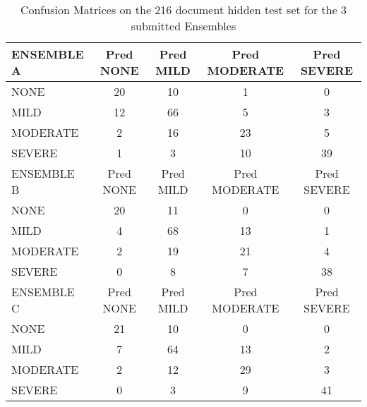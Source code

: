 \begin{table}
\centering
    \begin{tabular}{|l|c|c|c|c|}
       \hline
       \textsf{ \cellcolor{gray!15} ENSEMBLE A } & \textsf{ Pred NONE } & \textsf{ Pred MILD } & \textsf{ Pred MODERATE } & \textsf{ Pred SEVERE } \\ 
       \hline
        \textsf{ NONE } & \cellcolor{gray!15} 20 & 10 & 1 & 0 \\ 
        \textsf{ MILD } & 12 & \cellcolor{gray!15} 66 & 5 & 3 \\ 
        \textsf{ MODERATE } & 2 & 16 & \cellcolor{gray!15} 23 & 5 \\ 
        \textsf{ SEVERE } & 1 & 3 & 10 & \cellcolor{gray!15} 39 \\ 
       \hline
       \textsf{ \cellcolor{gray!15} ENSEMBLE B } & \textsf{ Pred NONE } & \textsf{ Pred MILD } & \textsf{ Pred MODERATE } & \textsf{ Pred SEVERE } \\ 
       \hline
        \textsf{ NONE } & \cellcolor{gray!15} 20 & 11 & 0 & 0 \\ 
        \textsf{ MILD } & 4 & \cellcolor{gray!15} 68 & 13 & 1 \\ 
        \textsf{ MODERATE } & 2 & 19 & \cellcolor{gray!15} 21 & 4 \\ 
        \textsf{ SEVERE } & 0 & 8 & 7 & \cellcolor{gray!15} 38 \\ 
       \hline
       \textsf{\cellcolor{gray!15} ENSEMBLE C } & \textsf{ Pred NONE } & \textsf{ Pred MILD } & \textsf{ Pred MODERATE } & \textsf{ Pred SEVERE } \\ 
       \hline
        \textsf{ NONE } & \cellcolor{gray!15} 21 & 10 & 0 & 0 \\ 
        \textsf{ MILD } & 7 & \cellcolor{gray!15} 64 & 13 & 2 \\ 
        \textsf{ MODERATE } & 2 & 12 & \cellcolor{gray!15} 29 & 3 \\ 
        \textsf{ SEVERE } & 0 & 3 & 9 & \cellcolor{gray!15} 41 \\ 
       \hline
    \end{tabular}
    \caption{Confusion Matrices on the 216 document hidden test set for the 3 submitted Ensembles}
    \label{tab:EnsembleTestConfusionMatrix}
\end{table}

